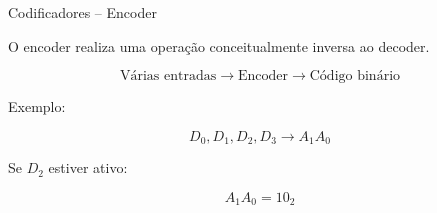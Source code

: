 \begin{frame}{Codificadores -- Encoder}

    O encoder realiza uma operação conceitualmente inversa
    ao decoder.

    \[
        \boxed{\text{Várias entradas}}
        \longrightarrow
        \boxed{\text{Encoder}}
        \longrightarrow
        \boxed{\text{Código binário}}
    \]

    \vspace{0.5cm}

    Exemplo:

    \[
        D_0,D_1,D_2,D_3
        \longrightarrow
        A_1A_0
    \]

    Se $D_2$ estiver ativo:

    \[
        A_1A_0=10_2
    \]

\end{frame}
